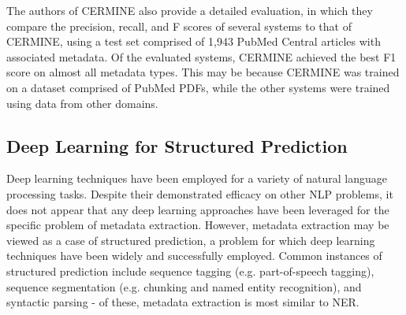 \documentclass{acm_proc_article-sp}
\begin{document}
The authors of CERMINE also provide a detailed evaluation, in which they compare the precision, recall, and F scores of several systems to that of CERMINE, using a test set comprised of 1,943 PubMed Central articles with associated metadata. Of the evaluated systems, CERMINE achieved the best F1 score on almost all metadata types. This may be because CERMINE was trained on a dataset comprised of PubMed PDFs, while the other systems were trained using data from other domains.


\subsection{Deep Learning for Structured Prediction}
Deep learning techniques have been employed for a variety of natural language processing tasks. Despite their demonstrated efficacy on other NLP problems, it does not appear that any deep learning approaches have been leveraged for the specific problem of metadata extraction. However, metadata extraction may be viewed as a case of structured prediction, a problem for which deep learning techniques have been widely and successfully employed. Common instances of structured prediction include sequence tagging (e.g. part-of-speech tagging), sequence segmentation (e.g. chunking and named entity recognition), and syntactic parsing - of these, metadata extraction is most similar to NER. \cite{goldberg2016primer}
\end{document}
